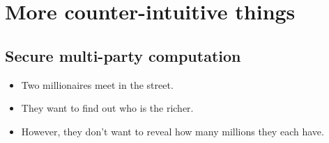 \mode*




\section{More counter-intuitive things}

\subsection{Secure multi-party computation}

\begin{frame}
  \begin{example}
    \begin{itemize}
      \item Two millionaires meet in the street.
      \item They want to find out who is the richer.

        \pause{}

      \item However, they don't want to reveal how many millions they each 
        have.
    \end{itemize}
  \end{example}
\end{frame}

